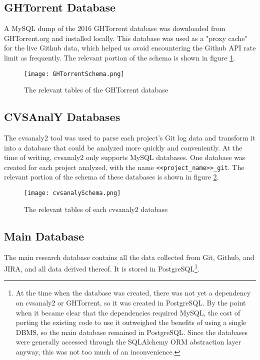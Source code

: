 \subsection{GHTorrent Database}
A MySQL dump of the 2016 GHTorrent database was downloaded from GHTorrent.org and installed locally. This database was used as a "proxy cache" for the live Github data, which helped us  
avoid encountering the Github API rate limit as frequently. The relevant portion of the schema is shown in figure \ref{fig:ghtorrentSchema}.
\begin{figure}
	\texttt{[image: GHTorrentSchema.png]}
	\centering
	\caption{The relevant tables of the GHTorrent database }
	\label{fig:ghtorrentSchema}
\end{figure}
\subsection{CVSAnalY Databases}
 The cvsanaly2 tool\cite{cvsanaly} was used to parse each project's Git log data and transform it into a database that could be analyzed more quickly and conveniently. At the time of writing, cvsanaly2 only supports MySQL databases. One database was created for each project analyzed, with the name \verb|<<project_name>>_git|. The relevant portion of the schema of these databases is shown in figure \ref{fig:cvsanalySchema}.
\begin{figure}
	\texttt{[image: cvsanalySchema.png]}
	\centering
	\caption{The relevant tables of each cvsanaly2 database}
	\label{fig:cvsanalySchema}
\end{figure}
\subsection{Main Database}
The main research database contains all the data collected from Git, Github, and JIRA, and all data derived thereof. It is stored in PostgreSQL\footnote{At the time when the database was created, there was not yet a dependency on cvsanaly2 or GHTorrent, so it was created in PostgreSQL. By the point when it became clear that the dependencies required MySQL, the cost of porting the existing code to use it outweighed the benefits of using a single DBMS, so the main database remained in PostgreSQL. Since the databases were generally accessed through the SQLAlchemy ORM abstraction layer anyway, this was not too much of an inconvenience.}.


